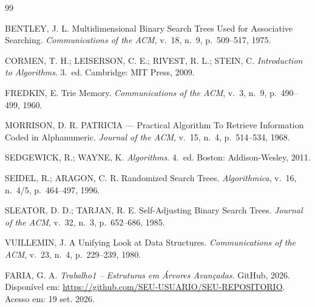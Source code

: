 \documentclass[conference]{IEEEtran}
\begin{document}
\begin{thebibliography}{99}

BENTLEY, J. L. Multidimensional Binary Search Trees Used for Associative Searching. \textit{Communications of the ACM}, v.~18, n.~9, p.~509--517, 1975.

CORMEN, T. H.; LEISERSON, C. E.; RIVEST, R. L.; STEIN, C. \textit{Introduction to Algorithms}. 3.~ed. Cambridge: MIT Press, 2009.

FREDKIN, E. Trie Memory. \textit{Communications of the ACM}, v.~3, n.~9, p.~490--499, 1960.

MORRISON, D. R. PATRICIA --- Practical Algorithm To Retrieve Information Coded in Alphanumeric. \textit{Journal of the ACM}, v.~15, n.~4, p.~514--534, 1968.

SEDGEWICK, R.; WAYNE, K. \textit{Algorithms}. 4.~ed. Boston: Addison-Wesley, 2011.

SEIDEL, R.; ARAGON, C. R. Randomized Search Trees. \textit{Algorithmica}, v.~16, n.~4/5, p.~464--497, 1996.

SLEATOR, D. D.; TARJAN, R. E. Self-Adjusting Binary Search Trees. \textit{Journal of the ACM}, v.~32, n.~3, p.~652--686, 1985.

VUILLEMIN, J. A Unifying Look at Data Structures. \textit{Communications of the ACM}, v.~23, n.~4, p.~229--239, 1980.

FARIA, G. A. \textit{Trabalho1 -- Estruturas em Árvores Avançadas}. GitHub, 2026. Disponível em: \url{https://github.com/SEU-USUARIO/SEU-REPOSITORIO}. Acesso em: 19 set. 2026.

\end{thebibliography}
\end{document}

